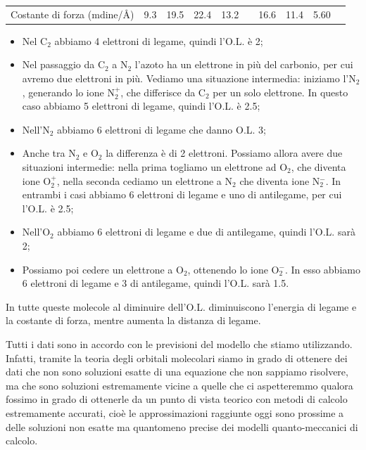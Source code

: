 \begin{center}
\begin{tabular}{ m{3cm}m{1cm}m{1cm}m{1cm}m{1cm}|m{1cm}m{1cm}m{1cm}m{1cm}m{1cm}}
        \vspace{0.2cm}Costante di forza (mdine/Å) & 9.3 & 19.5 & 22.4 & 13.2 & & 16.6 & 11.4 & 5.60
    \end{tabular}
\end{center}

\begin{itemize}
    \item Nel C$_2$ abbiamo 4 elettroni di legame, quindi l'O.L. è 2;
    \item Nel passaggio da C$_2$ a N$_2$ l'azoto ha un elettrone in più del carbonio, per cui avremo due elettroni in più. Vediamo una situazione intermedia: iniziamo l'N$_2$, generando lo ione N$_2^+$, che differisce da C$_2$ per un solo elettrone. In questo caso abbiamo 5 elettroni di legame, quindi l'O.L. è 2.5;
    \item Nell'N$_2$ abbiamo 6 elettroni di legame che danno O.L. 3;
    \item Anche tra N$_2$ e O$_2$ la differenza è di 2 elettroni. Possiamo allora avere due situazioni intermedie: nella prima togliamo un elettrone ad O$_2$, che diventa ione O$_2^+$, nella seconda cediamo un elettrone a N$_2$ che diventa ione N$_2^-$. In entrambi i casi abbiamo 6 elettroni di legame e uno di antilegame, per cui l'O.L. è 2.5;
    \item Nell'O$_2$ abbiamo 6 elettroni di legame e due di antilegame, quindi l'O.L. sarà 2;
    \item Possiamo poi cedere un elettrone a O$_2$, ottenendo lo ione O$_2^-$. In esso abbiamo 6 elettroni di legame e 3 di antilegame, quindi l'O.L. sarà 1.5.
\end{itemize}

In tutte queste molecole al diminuire dell'O.L. diminuiscono l'energia di legame e la costante di forza, mentre aumenta la distanza di legame.

Tutti i dati sono in accordo con le previsioni del modello che stiamo utilizzando. Infatti, tramite la teoria degli orbitali molecolari siamo in grado di ottenere dei dati che non sono soluzioni esatte di una equazione che non sappiamo risolvere, ma che sono soluzioni estremamente vicine a quelle che ci aspetteremmo qualora fossimo in grado di ottenerle da un punto di vista teorico con metodi di calcolo estremamente accurati, cioè le approssimazioni raggiunte oggi sono prossime a delle soluzioni non esatte ma quantomeno precise dei modelli quanto-meccanici di calcolo.

\vspace{-0.3cm}

